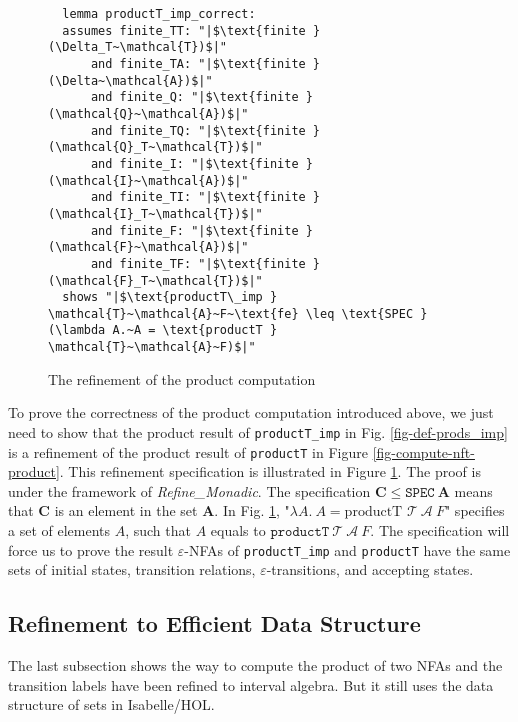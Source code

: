 \documentclass[a4paper,UKenglish,cleveref, autoref, thm-restate]{lipics-v2021}
\begin{document}
 

  \begin{figure}[hbt!]
    \begin{lstlisting}
  lemma productT_imp_correct:
  assumes finite_TT: "|$\text{finite } (\Delta_T~\mathcal{T})$|"    
      and finite_TA: "|$\text{finite } (\Delta~\mathcal{A})$|"
      and finite_Q: "|$\text{finite } (\mathcal{Q}~\mathcal{A})$|"
      and finite_TQ: "|$\text{finite } (\mathcal{Q}_T~\mathcal{T})$|"
      and finite_I: "|$\text{finite } (\mathcal{I}~\mathcal{A})$|"
      and finite_TI: "|$\text{finite } (\mathcal{I}_T~\mathcal{T})$|"
      and finite_F: "|$\text{finite } (\mathcal{F}~\mathcal{A})$|"
      and finite_TF: "|$\text{finite } (\mathcal{F}_T~\mathcal{T})$|"
  shows "|$\text{productT\_imp } \mathcal{T}~\mathcal{A}~F~\text{fe} \leq \text{SPEC } (\lambda A.~A = \text{productT } \mathcal{T}~\mathcal{A}~F)$|"
  \end{lstlisting}
  \caption{The refinement of the product computation}
  \label{fig-def-productT_imp_correct}
  \end{figure}

  To prove the correctness of the product computation introduced above, we just need to show that the product result of \texttt{productT\_imp} in Fig. \ref{fig-def-prods_imp} is a refinement of the product result of \texttt{productT} in Figure \ref{fig-compute-nft-product}. This refinement specification is illustrated in Figure \ref{fig-def-productT_imp_correct}. The proof is under the framework of \emph{Refine\_Monadic}. The specification $\mathbf{C} \leq\texttt{SPEC}~\mathbf{A}$ means that $\mathbf{C}$ is an element in the set $\mathbf{A}$. In Fig. \ref{fig-def-productT_imp_correct}, "$\lambda A.~A = \text{productT } \mathcal{T}~\mathcal{A}~F$" specifies a set of elements $A$, such that $A$ equals to $\texttt{productT}~\mathcal{T}~\mathcal{A}~F$. 
  The specification will force us to prove the result $\varepsilon$-NFAs of \texttt{productT\_imp}  and \texttt{productT} have the same sets of initial states, transition relations, $\varepsilon$-transitions, and accepting states.

\subsection{Refinement to Efficient Data Structure}

The last subsection shows the way to compute the product of two NFAs and the transition labels have been refined to interval algebra. But it still uses the data structure of sets in Isabelle/HOL. 
\end{document}
